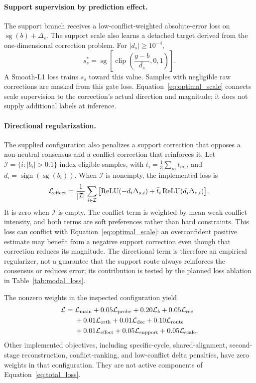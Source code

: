 \documentclass[review,12pt]{elsarticle}
\newcommand{\sg}{\operatorname{sg}}
\newcommand{\clip}{\operatorname{clip}}
\begin{document}
\paragraph{Support supervision by prediction effect.}
The support branch receives a low-conflict-weighted absolute-error loss on $\sg(b)+\Delta_s$. The support scale also learns a detached target derived from the one-dimensional correction problem. For $|d_s|\ge 10^{-4}$,
\begin{equation}
s_s^*=\sg\left[\clip\left(\frac{y-b}{d_s},0,1\right)\right].
\label{eq:optimal_scale}
\end{equation}
A Smooth-L1 loss trains $s_s$ toward this value. Samples with negligible raw corrections are masked from this gate loss. Equation~\eqref{eq:optimal_scale} connects scale supervision to the correction's actual direction and magnitude; it does not supply additional labels at inference.

\paragraph{Directional regularization.}
The supplied configuration also penalizes a support correction that opposes a non-neutral consensus and a conflict correction that reinforces it. Let $\mathcal I=\{i:|b_i|>0.1\}$ index eligible samples, with $\bar t_i=\frac13\sum_m t_{m,i}$ and $d_i=\operatorname{sign}(\sg(b_i))$. When $\mathcal I$ is nonempty, the implemented loss is
\begin{equation}
\mathcal L_{\rm effect}=\frac{1}{|\mathcal I|}\sum_{i\in\mathcal I}
\left[\operatorname{ReLU}(-d_i\Delta_{s,i})
+\bar t_i\operatorname{ReLU}(d_i\Delta_{c,i})\right].
\label{eq:effect_loss}
\end{equation}
It is zero when $\mathcal I$ is empty. The conflict term is weighted by mean weak conflict intensity, and both terms are soft preferences rather than hard constraints. This loss can conflict with Equation~\eqref{eq:optimal_scale}: an overconfident positive estimate may benefit from a negative support correction even though that correction reduces its magnitude. The directional term is therefore an empirical regularizer, not a guarantee that the support route always reinforces the consensus or reduces error; its contribution is tested by the planned loss ablation in Table~\ref{tab:modal_loss}.

The nonzero weights in the inspected configuration yield
\begin{align}
\mathcal L={}&\mathcal L_{\rm main}+0.05\mathcal L_{\rm probe}
+0.20\mathcal L_b+0.05\mathcal L_{\rm rec}\nonumber\\
&+0.01\mathcal L_{\rm orth}+0.01\mathcal L_{\rm dec}
+0.10\mathcal L_{\rm route}\nonumber\\
&+0.01\mathcal L_{\rm effect}+0.05\mathcal L_{\rm support}
+0.05\mathcal L_{\rm scale}.
\label{eq:total_loss}
\end{align}
Other implemented objectives, including specific-cycle, shared-alignment, second-stage reconstruction, conflict-ranking, and low-conflict delta penalties, have zero weights in that configuration. They are not active components of Equation~\eqref{eq:total_loss}.
\end{document}
